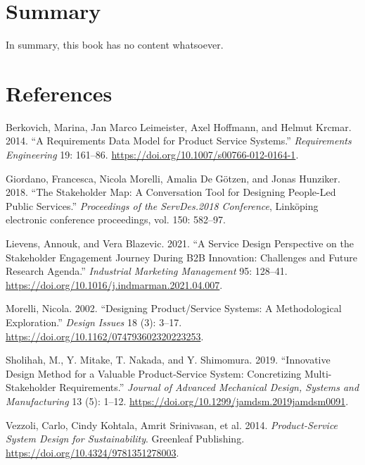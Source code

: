 \documentclass[
  letterpaper,
  DIV=11,
  numbers=noendperiod]{scrreprt}
\newlength{\cslhangindent}
\newenvironment{CSLReferences}[2] %
 {\begin{list}{}{%
  \setlength{\itemindent}{0pt}
  \setlength{\leftmargin}{0pt}
  \setlength{\parsep}{0pt}
  \ifodd #1
   \setlength{\leftmargin}{\cslhangindent}
   \setlength{\itemindent}{-1\cslhangindent}
  \fi
  \setlength{\itemsep}{#2\baselineskip}}}
 {\end{list}}
\begin{document}

\chapter{Summary}\label{summary}

In summary, this book has no content whatsoever.


\chapter*{References}\label{references}


\protect{}\label{refs}
\begin{CSLReferences}{1}{1}
Berkovich, Marina, Jan Marco Leimeister, Axel Hoffmann, and Helmut
Krcmar. 2014. {``A Requirements Data Model for Product Service
Systems.''} \emph{Requirements Engineering} 19: 161--86.
\url{https://doi.org/10.1007/s00766-012-0164-1}.

Giordano, Francesca, Nicola Morelli, Amalia De Götzen, and Jonas
Hunziker. 2018. {``The Stakeholder Map: A Conversation Tool for
Designing People-Led Public Services.''} \emph{Proceedings of the
ServDes.2018 Conference}, Linköping electronic conference proceedings,
vol. 150: 582--97.

Lievens, Annouk, and Vera Blazevic. 2021. {``A Service Design
Perspective on the Stakeholder Engagement Journey During B2B Innovation:
Challenges and Future Research Agenda.''} \emph{Industrial Marketing
Management} 95: 128--41.
\url{https://doi.org/10.1016/j.indmarman.2021.04.007}.

Morelli, Nicola. 2002. {``Designing Product/Service Systems: A
Methodological Exploration.''} \emph{Design Issues} 18 (3): 3--17.
\url{https://doi.org/10.1162/074793602320223253}.

Sholihah, M., Y. Mitake, T. Nakada, and Y. Shimomura. 2019.
{``Innovative Design Method for a Valuable Product-Service System:
Concretizing Multi-Stakeholder Requirements.''} \emph{Journal of
Advanced Mechanical Design, Systems and Manufacturing} 13 (5): 1--12.
\url{https://doi.org/10.1299/jamdsm.2019jamdsm0091}.

Vezzoli, Carlo, Cindy Kohtala, Amrit Srinivasan, et al. 2014.
\emph{Product-Service System Design for Sustainability}. Greenleaf
Publishing. \url{https://doi.org/10.4324/9781351278003}.

\end{CSLReferences}
\end{document}
